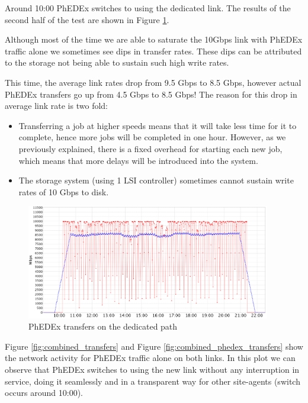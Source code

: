 Around 10:00 PhEDEx switches to using the dedicated link. The results of the 
second half of the test are shown in Figure \ref{fig:solo_transfers}.

Although most of the time we are able to saturate the 10Gbps link with PhEDEx 
traffic alone we sometimes see dips in transfer rates. These dips can be attributed 
to the storage not being able to sustain such high write rates.

This time, the average link rates drop from 9.5 Gbps to 8.5 Gbps, however 
actual PhEDEx transfers go up from 4.5 Gbps to 8.5 Gbps! The reason for this 
drop in average link rate is two fold: 

\begin{itemize}
  \item Transferring a job at higher speeds means that it will take less time for
  it to complete, hence more jobs will be completed in one hour. However, as
  we previously explained, there is a fixed overhead for starting each new job, which
  means that more delays will be introduced into the system.
  \item The storage system (using 1 LSI controller) sometimes cannot sustain
  write rates of 10 Gbps to disk.
\end{itemize}

\begin{figure}[h]
  \centering
  \includegraphics[width=0.95\textwidth]{Figures/FileDownload_Solo_path.png}
  \caption{PhEDEx transfers on the dedicated path}
    \label{fig:solo_transfers}
\end{figure} 

Figure \ref{fig:combined_transfers} and Figure \ref{fig:combined_phedex_transfers} show
the  network activity for PhEDEx traffic alone on both links. 
In this plot we can observe that PhEDEx switches to using the
new link without any interruption in service, doing it seamlessly and in a 
transparent way for other site-agents (switch occurs around 10:00).

